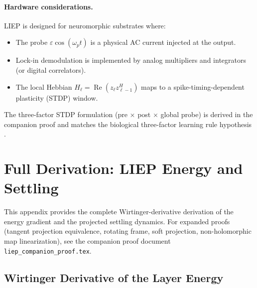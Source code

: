 \documentclass[11pt]{article}
\DeclareMathOperator{\Real}{Re}
\begin{document}
\paragraph{Hardware considerations.}
LIEP is designed for neuromorphic substrates where:
\begin{itemize}
\item The probe $\varepsilon\cos(\omega_p t)$ is a physical AC current injected at the output.
\item Lock-in demodulation is implemented by analog multipliers and integrators (or digital correlators).
\item The local Hebbian $H_\ell = \Real(z_\ell z_{\ell-1}^H)$ maps to a spike-timing-dependent plasticity (STDP) window.
\end{itemize}
The three-factor STDP formulation (pre $\times$ post $\times$ global probe) is derived in the companion proof and matches the biological three-factor learning rule hypothesis \citep{ororbia2023brain}.

\appendix
\section{Full Derivation: LIEP Energy and Settling}\label{sec:liep_proof}

This appendix provides the complete Wirtinger-derivative derivation of the energy gradient and the projected settling dynamics. For expanded proofs (tangent projection equivalence, rotating frame, soft projection, non-holomorphic map linearization), see the companion proof document \texttt{liep\_companion\_proof.tex}.

\subsection{Wirtinger Derivative of the Layer Energy}
\end{document}
